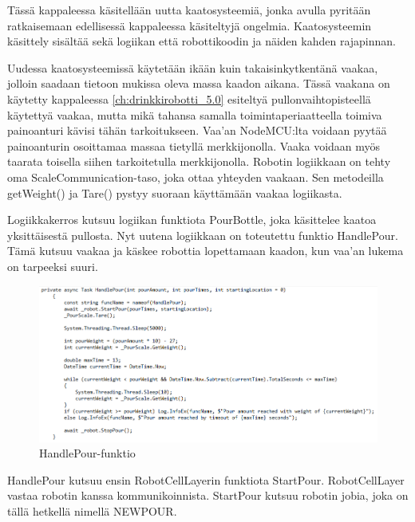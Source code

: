 Tässä kappaleessa käsitellään uutta kaatosysteemiä, jonka avulla pyritään ratkaisemaan edellisessä kappaleessa käsiteltyjä ongelmia. Kaatosysteemin käsittely sisältää sekä logiikan että robottikoodin ja näiden kahden rajapinnan.

Uudessa kaatosysteemissä käytetään ikään kuin takaisinkytkentänä vaakaa, jolloin saadaan tietoon mukissa oleva massa kaadon aikana. Tässä vaakana on käytetty kappaleessa \ref{ch:drinkkirobotti_5.0} esiteltyä pullonvaihtopisteellä käytettyä vaakaa, mutta mikä tahansa samalla toimintaperiaatteella toimiva painoanturi kävisi tähän tarkoitukseen. Vaa'an NodeMCU:lta voidaan pyytää painoanturin osoittamaa massaa tietyllä merkkijonolla. Vaaka voidaan myös taarata toisella siihen tarkoitetulla merkkijonolla. Robotin logiikkaan on tehty oma ScaleCommunication-taso, joka ottaa yhteyden vaakaan. Sen metodeilla getWeight() ja Tare() pystyy suoraan käyttämään vaakaa logiikasta.


Logiikkakerros kutsuu logiikan funktiota PourBottle, joka käsittelee kaatoa yksittäisestä pullosta. Nyt uutena logiikkaan on toteutettu funktio HandlePour. Tämä kutsuu vaakaa ja käskee robottia lopettamaan kaadon, kun vaa'an lukema on tarpeeksi suuri.

\begin{figure}[h]
\begin{center}
\includegraphics[scale=0.6]{img/HandlePour.png}
\end{center}
\caption{HandlePour-funktio}
\label{fig:HandlePour}
\end{figure}

HandlePour kutsuu ensin RobotCellLayerin funktiota StartPour. RobotCellLayer vastaa robotin kanssa kommunikoinnista. StartPour kutsuu robotin jobia, joka on tällä hetkellä nimellä NEWPOUR.

